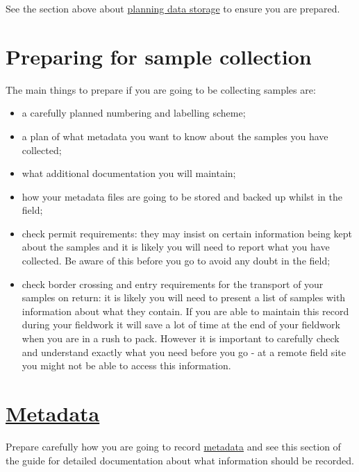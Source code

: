 \documentclass[12pt,a4paper,oneside]{report}
\providecommand{\tightlist}{%
  \setlength{\itemsep}{0pt}\setlength{\parskip}{0pt}}
\begin{document}
See the section above about
\protect\hyperlink{how-much-data-are-you-planning-to-collect}{planning
data storage} to ensure you are prepared.

\hypertarget{preparing-for-sample-collection}{%
\section{Preparing for sample
collection}\label{preparing-for-sample-collection}}

The main things to prepare if you are going to be collecting samples
are:

\begin{itemize}
\tightlist
\item
  a carefully planned numbering and labelling scheme;
\item
  a plan of what metadata you want to know about the samples you have
  collected;
\item
  what additional documentation you will maintain;
\item
  how your metadata files are going to be stored and backed up whilst in
  the field;
\item
  check permit requirements: they may insist on certain information
  being kept about the samples and it is likely you will need to report
  what you have collected. Be aware of this before you go to avoid any
  doubt in the field;
\item
  check border crossing and entry requirements for the transport of your
  samples on return: it is likely you will need to present a list of
  samples with information about what they contain. If you are able to
  maintain this record during your fieldwork it will save a lot of time
  at the end of your fieldwork when you are in a rush to pack. However
  it is important to carefully check and understand exactly what you
  need before you go - at a remote field site you might not be able to
  access this information.
\end{itemize}

\hypertarget{metadata}{%
\section{\texorpdfstring{\protect\hyperlink{metadata}{Metadata}}{Metadata}}\label{metadata}}

Prepare carefully how you are going to record
\protect\hyperlink{metadata}{metadata} and see this section of the guide
for detailed documentation about what information should be recorded.
\end{document}
